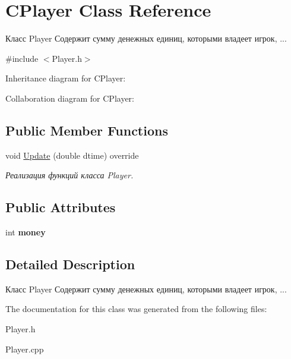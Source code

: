 \hypertarget{classCPlayer}{}\section{C\+Player Class Reference}
\label{classCPlayer}


Класс Player Содержит сумму денежных единиц, которыми владеет игрок, ...  




{\ttfamily \#include $<$Player.\+h$>$}



Inheritance diagram for C\+Player\+:


Collaboration diagram for C\+Player\+:
\subsection*{Public Member Functions}
\begin{DoxyCompactItemize}
\item 
void \hyperlink{classCPlayer_aeca038d0b0e8a7e8a6920dc066a2a22d}{Update} (double dtime) override\hypertarget{classCPlayer_aeca038d0b0e8a7e8a6920dc066a2a22d}{}\label{classCPlayer_aeca038d0b0e8a7e8a6920dc066a2a22d}

\begin{DoxyCompactList}\small\item\em Реализация функций класса Player. \end{DoxyCompactList}\end{DoxyCompactItemize}
\subsection*{Public Attributes}
\begin{DoxyCompactItemize}
\item 
int {\bfseries money}\hypertarget{classCPlayer_a02883b33efaf47c5a1e9d184c388c83e}{}\label{classCPlayer_a02883b33efaf47c5a1e9d184c388c83e}

\end{DoxyCompactItemize}


\subsection{Detailed Description}
Класс Player Содержит сумму денежных единиц, которыми владеет игрок, ... 

The documentation for this class was generated from the following files\+:\begin{DoxyCompactItemize}
\item 
Player.\+h\item 
Player.\+cpp\end{DoxyCompactItemize}
